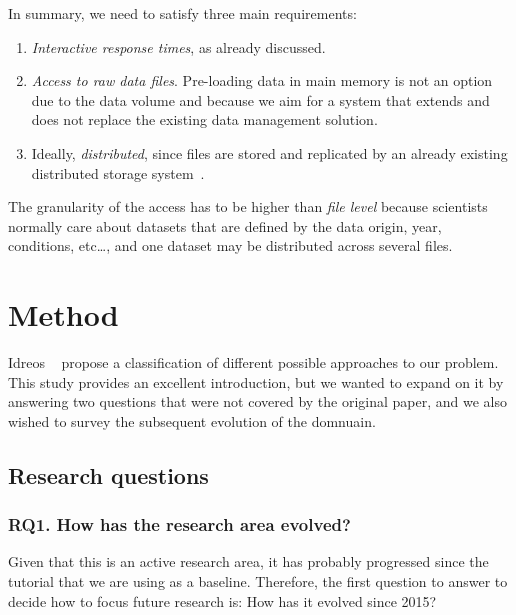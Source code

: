 
In summary, we need to satisfy three main requirements:

\begin{enumerate}
  \item \emph{Interactive response times}, as already discussed.
  \item \emph{Access to raw data files}. Pre-loading data in main memory is not an
    option due to the data volume and because we aim for a system that extends and does
    not replace the existing data management solution.
  \item Ideally, \emph{distributed}, since files are stored and replicated by an already existing
    distributed storage system~\cite{Baud2012}.
\end{enumerate}

The granularity of the access has to be higher than \emph{file level} because
scientists normally care about datasets that are defined by the data origin,
year, conditions, etc\ldots, and one dataset may be distributed across
several files.

\section{Method}
\label{sec:mapping/method}

Idreos \etal~\cite{Idreos2015} propose a classification of different possible approaches
to our problem.
This study provides an excellent introduction, but we wanted to expand on it by answering
two questions that were not covered by the original paper, and we also wished to survey
the subsequent evolution of the domnuain.

\subsection{Research questions}
\label{sec:mapping/research_questions}

\subsubsection{RQ1. How has the research area evolved?}
Given that this is an active research area, it has probably progressed since
the tutorial that we are using as a baseline. Therefore, the first
question to answer to decide how to focus future research is:
How has it evolved since 2015?


